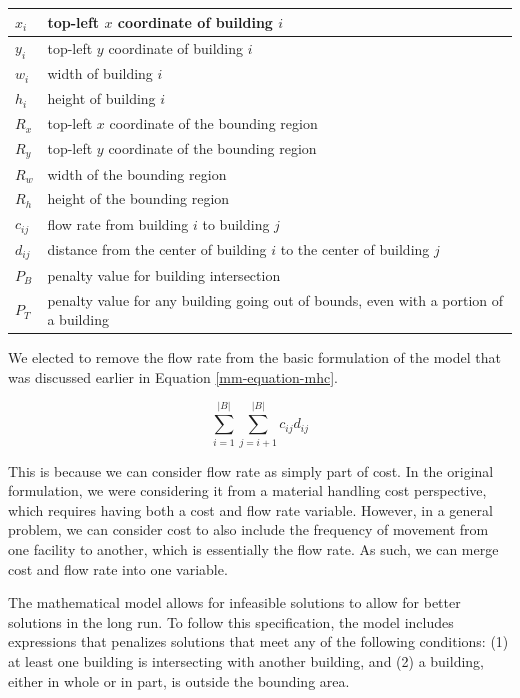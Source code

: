 \begin{table}[h!]
	\centering
	\begin{tabular}{| l | p{10cm} |}
	\hline
	$x_{i}$  & top-left $x$ coordinate of building $i$ \\
	\hline
	$y_{i}$  & top-left $y$ coordinate of building $i$ \\
	\hline
	$w_{i}$  & width of building $i$ \\
	\hline
	$h_{i}$  & height of building $i$ \\
	\hline
	$R_{x}$  & top-left $x$ coordinate of the bounding region \\
	\hline
	$R_{y}$  & top-left $y$ coordinate of the bounding region \\
	\hline
	$R_{w}$  & width of the bounding region \\
	\hline
	$R_{h}$  & height of the bounding region \\
	\hline
	$c_{ij}$ & flow rate from building $i$ to building $j$ \\
	\hline
	$d_{ij}$ & distance from the center of building $i$ to the
	           center of building $j$ \\
	\hline
	$P_{B}$  & penalty value for building intersection \\
	\hline
	$P_{T}$  & penalty value for any building going out of
	           bounds, even with a portion of a building \\
	\hline
	\end{tabular}
\end{table}

We elected to remove the flow rate from the basic formulation of the model that was discussed earlier in Equation \ref{mm-equation-mhc}. 

\begin{equation}\label{mm-equation-mhc}
	\sum_{i=1}^{\left | B \right |}\sum_{j=i + 1}^{\left | B \right |}c_{ij}d_{ij}
\end{equation}

This is because we can consider flow rate as simply part of cost. In the original formulation, we were considering it from a material handling cost perspective, which requires having both a cost and flow rate variable. However, in a general problem, we can consider cost to also include the frequency of movement from one facility to another, which is essentially the flow rate. As such, we can merge cost and flow rate into one variable.

The mathematical model allows for infeasible solutions to allow for better solutions in the long run. To follow this specification, the model includes expressions that penalizes solutions that meet any of the following conditions: (1) at least one building is intersecting with another building, and (2) a building, either in whole or in part, is outside the bounding area.

